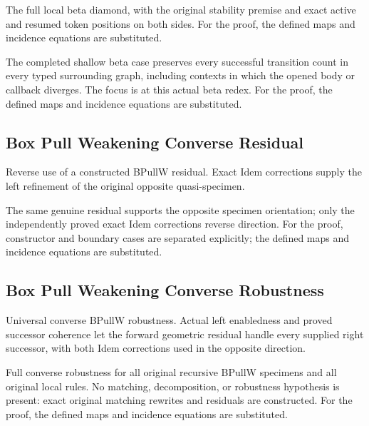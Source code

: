 The full local beta diamond, with the original stability premise and exact active and resumed token positions on both sides.
For the proof, the defined maps and incidence equations are substituted.
\par{}

The completed shallow beta case preserves every successful transition count in every typed surrounding graph, including contexts in which the opened body or callback diverges. The focus is at this actual beta redex.
For the proof, the defined maps and incidence equations are substituted.
\par{}

\subsection{Box Pull Weakening Converse Residual}
Reverse use of a constructed BPullW residual. Exact Idem corrections supply the left refinement of the original opposite quasi-specimen.

The same genuine residual supports the opposite specimen orientation; only the independently proved exact Idem corrections reverse direction.
For the proof, constructor and boundary cases are separated explicitly; the defined maps and incidence equations are substituted.
\par{}

\subsection{Box Pull Weakening Converse Robustness}
Universal converse BPullW robustness. Actual left enabledness and proved successor coherence let the forward geometric residual handle every supplied right successor, with both Idem corrections used in the opposite direction.

Full converse robustness for all original recursive BPullW specimens and all original local rules. No matching, decomposition, or robustness hypothesis is present: exact original matching rewrites and residuals are constructed.
For the proof, the defined maps and incidence equations are substituted.
\par{}

